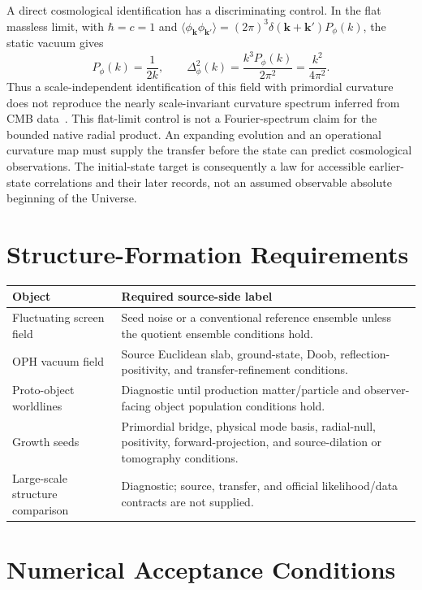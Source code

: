 \documentclass[11pt]{article}
\theoremstyle{remark}
\theoremstyle{plain}
\begin{document}
A direct cosmological identification has a discriminating control.
In the flat massless limit, with \(\hbar=c=1\) and
\(\langle\phi_{\mathbf k}\phi_{\mathbf k'}\rangle
=(2\pi)^3\delta(\mathbf k+\mathbf k')P_\phi(k)\), the static vacuum gives
\[
 P_\phi(k)=\frac1{2k},\qquad
 \Delta_\phi^2(k)=\frac{k^3P_\phi(k)}{2\pi^2}
                  =\frac{k^2}{4\pi^2}.
\]
Thus a scale-independent identification of this field with primordial
curvature does not reproduce the nearly scale-invariant curvature spectrum
inferred from CMB data~\cite{planckinflation}. This flat-limit control is
not a Fourier-spectrum claim for the bounded native radial product.
An expanding evolution and an operational curvature map must supply the
transfer before the state can predict cosmological observations. The
initial-state target is consequently a law for accessible earlier-state
correlations and their later records, not an assumed observable absolute
beginning of the Universe.

\section{Structure-Formation Requirements}

\begin{longtable}{@{}L{0.28\textwidth}L{0.62\textwidth}@{}}
\toprule
Object & Required source-side label\\
\midrule
\endhead
\bottomrule
\endfoot
Fluctuating screen field & Seed noise or a conventional reference ensemble unless the quotient
ensemble conditions hold.\\
OPH vacuum field & Source Euclidean slab, ground-state, Doob, reflection-positivity,
and transfer-refinement conditions.\\
Proto-object worldlines & Diagnostic until production matter/particle and observer-facing object
population conditions hold.\\
Growth seeds & Primordial bridge, physical mode basis,
radial-null, positivity, forward-projection, and source-dilation or tomography
conditions.\\
Large-scale structure comparison & Diagnostic; source, transfer, and official likelihood/data
contracts are not supplied.\\
\end{longtable}

\section{Numerical Acceptance Conditions}
\end{document}
